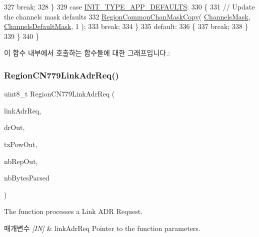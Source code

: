 \begin{DoxyCode}
327             \textcolor{keywordflow}{break};
328         \}
329         \textcolor{keywordflow}{case} \mbox{\hyperlink{group___r_e_g_i_o_n_gga11ecad794560a3d3961bdf1c9a27d3b2a3d260b94611dd833c5243c16ca26c3f0}{INIT\_TYPE\_APP\_DEFAULTS}}:
330         \{
331             \textcolor{comment}{// Update the channels mask defaults}
332             \mbox{\hyperlink{group___r_e_g_i_o_n_c_o_m_m_o_n_ga95f5199d490113269fae7f2e0569e9a0}{RegionCommonChanMaskCopy}}( \mbox{\hyperlink{_region_c_n779_8c_a2188957b5ca6af8092154d7ccbfa5757}{ChannelsMask}}, 
      \mbox{\hyperlink{_region_c_n779_8c_ac127b19779301713d5ed92eb03366a2d}{ChannelsDefaultMask}}, 1 );
333             \textcolor{keywordflow}{break};
334         \}
335         \textcolor{keywordflow}{default}:
336         \{
337             \textcolor{keywordflow}{break};
338         \}
339     \}
340 \}
\end{DoxyCode}
이 함수 내부에서 호출하는 함수들에 대한 그래프입니다.\+:
\mbox{\label{group___r_e_g_i_o_n_c_n779_gae3bdb6e223de1fd6b72182eb278f3828}} 
\subsubsection{\texorpdfstring{Region\+C\+N779\+Link\+Adr\+Req()}{RegionCN779LinkAdrReq()}}
{\footnotesize\ttfamily uint8\+\_\+t Region\+C\+N779\+Link\+Adr\+Req (\begin{DoxyParamCaption}\item[{\mbox{\hyperlink{group___r_e_g_i_o_n_gad4af503e8d4de1846129e26a799a1e8e}{Link\+Adr\+Req\+Params\+\_\+t}} $\ast$}]{link\+Adr\+Req,  }\item[{int8\+\_\+t $\ast$}]{dr\+Out,  }\item[{int8\+\_\+t $\ast$}]{tx\+Pow\+Out,  }\item[{uint8\+\_\+t $\ast$}]{nb\+Rep\+Out,  }\item[{uint8\+\_\+t $\ast$}]{nb\+Bytes\+Parsed }\end{DoxyParamCaption})}



The function processes a Link A\+DR Request. 


\begin{DoxyParams}{매개변수}
{\em \mbox{[}\+I\+N\mbox{]}} & link\+Adr\+Req Pointer to the function parameters.\\
\hline
\end{DoxyParams}

